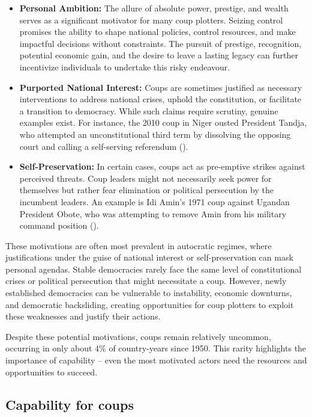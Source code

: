 \documentclass[
  12pt,
]{report}
\begin{document}
\begin{itemize}
\item
  \textbf{Personal Ambition:} The allure of absolute power, prestige,
  and wealth serves as a significant motivator for many coup plotters.
  Seizing control promises the ability to shape national policies,
  control resources, and make impactful decisions without constraints.
  The pursuit of prestige, recognition, potential economic gain, and the
  desire to leave a lasting legacy can further incentivize individuals
  to undertake this risky endeavour.
\item
  \textbf{Purported National Interest:} Coups are sometimes justified as
  necessary interventions to address national crises, uphold the
  constitution, or facilitate a transition to democracy. While such
  claims require scrutiny, genuine examples exist. For instance, the
  2010 coup in Niger ousted President Tandja, who attempted an
  unconstitutional third term by dissolving the opposing court and
  calling a self-serving referendum
  ().
\item
  \textbf{Self-Preservation:} In certain cases, coups act as pre-emptive
  strikes against perceived threats. Coup leaders might not necessarily
  seek power for themselves but rather fear elimination or political
  persecution by the incumbent leaders. An example is Idi Amin's 1971
  coup against Ugandan President Obote, who was attempting to remove
  Amin from his military command position
  ().
\end{itemize}

These motivations are often most prevalent in autocratic regimes, where
justifications under the guise of national interest or self-preservation
can mask personal agendas. Stable democracies rarely face the same level
of constitutional crises or political persecution that might necessitate
a coup. However, newly established democracies can be vulnerable to
instability, economic downturns, and democratic backsliding, creating
opportunities for coup plotters to exploit these weaknesses and justify
their actions.

Despite these potential motivations, coups remain relatively uncommon,
occurring in only about 4\% of country-years since 1950. This rarity
highlights the importance of capability -- even the most motivated
actors need the resources and opportunities to succeed.

\subsection{Capability for coups}\label{capability-for-coups}
\end{document}
